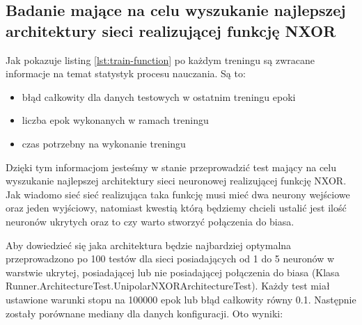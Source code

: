 \subsection{Badanie mające na celu wyszukanie najlepszej architektury sieci realizującej funkcję NXOR}

Jak pokazuje listing \ref{lst:train-function} po każdym treningu są zwracane informacje na temat statystyk 
procesu nauczania. Są to:
\begin{itemize}
  \item błąd całkowity dla danych testowych w ostatnim treningu epoki
  \item liczba epok wykonanych w ramach treningu
  \item czas potrzebny na wykonanie treningu
\end{itemize}

Dzięki tym informacjom jesteśmy w stanie przeprowadzić test mający na celu wyszukanie najlepszej architektury
sieci neuronowej realizującej funkcję NXOR.
Jak wiadomo sieć sieć realizująca taka funkcję musi mieć dwa neurony wejściowe oraz jeden wyjściowy,
natomiast kwestią którą będziemy chcieli ustalić jest ilość neuronów ukrytych oraz to
czy warto stworzyć połączenia do biasa.

Aby dowiedzieć się jaka architektura będzie najbardziej optymalna przeprowadzono po 100 testów
dla sieci posiadających od 1 do 5 neuronów w warstwie ukrytej, posiadającej lub nie posiadającej połączenia
do biasa (Klasa Runner.ArchitectureTest.UnipolarNXORArchitectureTest).
Każdy test miał ustawione warunki stopu na 100000 epok lub błąd całkowity równy 0.1.
Następnie zostały porównane mediany dla danych konfiguracji. Oto wyniki:

